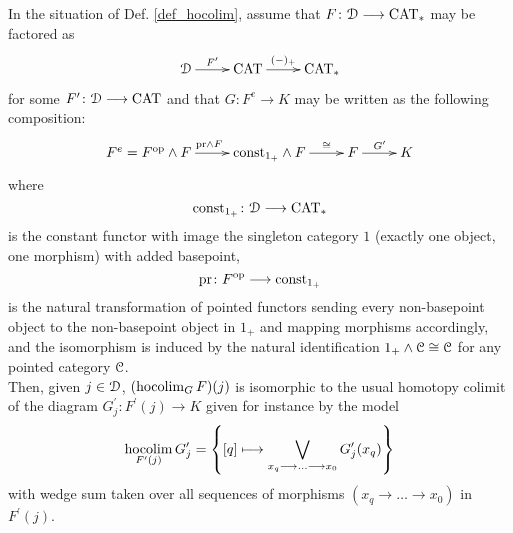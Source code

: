     \begin{lem}\label{lem_hocolim_name_justification}
      In the situation of Def. \ref{def_hocolim}, assume that $F \colon \mathcal{D} \longrightarrow
      \mathrm{CAT}_*$ may be factored as
      \begin{displaymath}
        \xymatrix{
          \cD \ar[r]^-{F^\prime} &
          \CAT \ar[r]^-{(-)_+} &
          \CAT_*
        }
      \end{displaymath}
      for some $F^\prime \colon \mathcal{D} \longrightarrow \mathrm{CAT}$ and that $G \colon F^e \to K$ may
      be written as the following composition:
      \begin{displaymath}
        \xymatrix{
          F^e = F^{\op} \wedge F \ar[r]^{\mathrm{pr} \wedge F} &
          \mathrm{const}_{1_+} \wedge F \ar[r]^-{\cong} &
          F \ar[r]^{G^\prime} &
          K
        }
      \end{displaymath}
      where 
      \begin{displaymath}
        \mathrm{const}_{1_+} \colon \mathcal{D} \longrightarrow \mathrm{CAT}_*
      \end{displaymath}
      is the constant functor with image the singleton category $1$ (exactly one
      object, one morphism) with added basepoint, 
      \begin{displaymath}
        \mathrm{pr} \colon F^{\mathrm{op}} \longrightarrow \mathrm{const}_{1_+}
      \end{displaymath}
      is the natural transformation of pointed functors sending every
      non-basepoint object to the non-basepoint object in $1_+$ and mapping
      morphisms accordingly, and the isomorphism is induced by the natural
      identification $1_+ \wedge \mathcal{C} \cong \mathcal{C}$ for any pointed category
      $\mathcal{C}$.\\
      Then, given $j \in \mathcal{D}$, $(\operatorname*{hocolim}_G F)(j)$ is isomorphic to the usual
      homotopy colimit of the diagram $G^\prime_j \colon F^\prime(j) \to K$
      given for instance by the model
      \begin{displaymath}
        \operatorname*{hocolim}_{F^\prime(j)} G_j^\prime = \left\{ 
          [q] \longmapsto \bigvee_{x_q \longrightarrow \ldots \longrightarrow x_0} G_j^\prime(x_q)
        \right\}
      \end{displaymath}
      with wedge sum taken over all sequences of morphisms $(x_q \to \ldots \to
      x_0)$ in $F^\prime(j)$.
    \end{lem}
